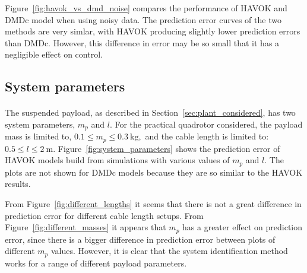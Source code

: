         

        Figure~\ref{fig:havok_vs_dmd_noise} compares the performance of HAVOK and DMDc model when using noisy data.
        The prediction error curves of the two methods are very simlar, with HAVOK producing slightly lower prediction errors than DMDc.
        However, this difference in error may be so small that it has a negligible effect on control.  

    \subsection{System parameters}
            
        \paragraph{}
        The suspended payload, as described in Section~\ref{sec:plant_considered},
        has two system parameters, $m_p$ and $l$.
        For the practical quadrotor considered, the payload mass is limited to,
        $
            0.1 \leq m_p \leq \SI{0.3}{\kilo\gram} ,
        $
        and the cable length is limited to:
        $
            0.5 \leq l \leq \SI{2}{\metre} .
        $
        Figure~\ref{fig:system_parameters} shows the prediction error of HAVOK models 
        build from simulations with various values of $m_p$ and $l$.
        The plots are not shown for DMDc models because they are so similar to the HAVOK results.

        

        From Figure~\ref{fig:different_lengths} it seems that there is not a great difference in prediction error 
        for different cable length setups.
        From Figure~\ref{fig:different_masses} it appears that $m_p$ has a greater effect on prediction error,
        since there is a bigger difference in prediction error between plots of different $m_p$ values.
        However, it is clear that the system identification method works for a range of different payload parameters.



